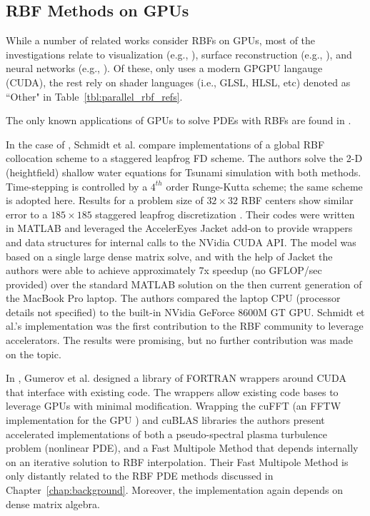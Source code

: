 \documentclass[11pt]{report}
\begin{document}
\subsection{RBF Methods on GPUs}


While a number of related works consider RBFs on GPUs, most of the investigations relate to visualization (e.g., \cite{Cuntz2007, Weiler2005}),  surface reconstruction (e.g., \cite{Corrigan2005,Carr2003}), and neural networks (e.g., \cite{Brandstetter2008}). Of these, only \cite{Cuntz2007} uses a modern GPGPU langauge (CUDA), the rest rely on shader languages (i.e., GLSL, HLSL, etc) denoted as ``Other" in Table~\ref{tbl:parallel_rbf_refs}.

The only known applications of GPUs to solve PDEs with RBFs are found in \cite{Gumerov2007a, Gumerov2007b,Schmidt2009a, Schmidt2009b}. 

In the case of \cite{Schmidt2009a, Schmidt2009b}, Schmidt et al. compare implementations of a global RBF collocation scheme to a staggered leapfrog FD scheme. The authors solve the 2-D (heightfield) shallow water equations for Tsunami simulation with both methods. Time-stepping is controlled by a $4^{th}$ order Runge-Kutta scheme; the same scheme is adopted here. Results for a problem size of $32\times32$ RBF centers show similar error to a $185\times 185$ staggered leapfrog discretization \cite{Schmidt2009b}. 
Their codes were written in MATLAB and leveraged the AccelerEyes Jacket \cite{JacketGuide2009} add-on to provide wrappers and data structures for internal calls to the NVidia CUDA API. The model was based on a single large dense matrix solve, and with the help of Jacket the authors were able to achieve approximately 7x speedup (no GFLOP/sec provided) over the standard MATLAB solution on the then current generation of the MacBook Pro laptop. The authors compared the laptop CPU (processor details not specified) to the built-in NVidia GeForce 8600M GT GPU. Schmidt et al.'s implementation was the first contribution to the RBF community to leverage accelerators. The results were promising, but no further contribution was made on the topic. 

In \cite{Gumerov2007a, Gumerov2007b}, Gumerov et al. designed a library of FORTRAN wrappers around CUDA that interface with existing code. The wrappers allow existing code bases to leverage GPUs with minimal modification. Wrapping the cuFFT (an FFTW implementation for the GPU \cite{CudaGuide2011}) and cuBLAS libraries the authors present accelerated implementations of both a pseudo-spectral plasma turbulence problem (nonlinear PDE), and a Fast Multipole Method that depends internally on an iterative solution to RBF interpolation. Their Fast Multipole Method is only distantly related to the RBF PDE methods discussed in Chapter~\ref{chap:background}. Moreover, the implementation again depends on dense matrix algebra.
\end{document}
